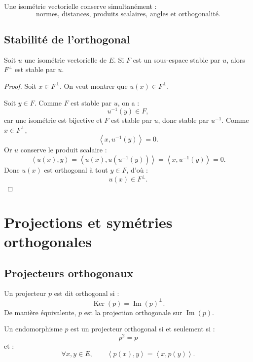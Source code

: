 \documentclass[11pt,a4paper]{article}
\newcommand{\Ker}{\operatorname{Ker}}
\newcommand{\Imf}{\operatorname{Im}}
\newcommand{\scal}[2]{\left\langle #1,#2\right\rangle}
\begin{document}
\begin{retenirbox}
Une isométrie vectorielle conserve simultanément :
\[
\text{normes, distances, produits scalaires, angles et orthogonalité.}
\]
\end{retenirbox}

\subsection{Stabilité de l'orthogonal}

\begin{theorembox}
Soit \(u\) une isométrie vectorielle de \(E\).  
Si \(F\) est un sous-espace stable par \(u\), alors \(F^\perp\) est stable par \(u\).
\end{theorembox}

\begin{proof}
Soit \(x\in F^\perp\).  
On veut montrer que \(u(x)\in F^\perp\).

Soit \(y\in F\).  
Comme \(F\) est stable par \(u\), on a :
\[
u^{-1}(y)\in F,
\]
car une isométrie est bijective et \(F\) est stable par \(u\), donc stable par \(u^{-1}\).  
Comme \(x\in F^\perp\),
\[
\scal{x}{u^{-1}(y)}=0.
\]
Or \(u\) conserve le produit scalaire :
\[
\scal{u(x)}{y}
=
\scal{u(x)}{u(u^{-1}(y))}
=
\scal{x}{u^{-1}(y)}
=
0.
\]
Donc \(u(x)\) est orthogonal à tout \(y\in F\), d'où :
\[
u(x)\in F^\perp.
\]
\end{proof}

\section{Projections et symétries orthogonales}

\subsection{Projecteurs orthogonaux}

\begin{definitionbox}
Un projecteur \(p\) est dit orthogonal si :
\[
\Ker(p)=\Imf(p)^\perp.
\]
De manière équivalente, \(p\) est la projection orthogonale sur \(\Imf(p)\).
\end{definitionbox}

\begin{theorembox}[Caractérisation]
Un endomorphisme \(p\) est un projecteur orthogonal si et seulement si :
\[
p^2=p
\]
et :
\[
\forall x,y\in E,\qquad \scal{p(x)}{y}=\scal{x}{p(y)}.
\]
\end{theorembox}
\end{document}
